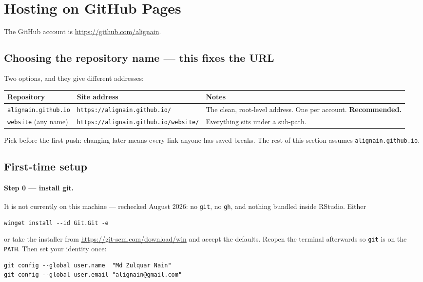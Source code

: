 \documentclass[11pt,a4paper]{article}
\begin{document}
\section{Hosting on GitHub Pages}

The GitHub account is \url{https://github.com/alignain}.

\subsection{Choosing the repository name --- this fixes the URL}

Two options, and they give different addresses:

\begin{center}
\begin{tabular}{@{}llp{5.4cm}@{}}
\toprule
\textbf{Repository} & \textbf{Site address} & \textbf{Notes} \\
\midrule
\texttt{alignain.github.io} & \texttt{https://alignain.github.io/} &
  The clean, root-level address. One per account. \textbf{Recommended.} \\
\texttt{website} (any name) & \texttt{https://alignain.github.io/website/} &
  Everything sits under a sub-path. \\
\bottomrule
\end{tabular}
\end{center}

Pick before the first push: changing later means every link anyone has
saved breaks. The rest of this section assumes \texttt{alignain.github.io}.

\subsection{First-time setup}

\paragraph{Step 0 --- install git.} It is not currently on this machine ---
rechecked August 2026: no \texttt{git}, no \texttt{gh}, and nothing bundled
inside RStudio. Either
\begin{lstlisting}
winget install --id Git.Git -e
\end{lstlisting}
or take the installer from \url{https://git-scm.com/download/win} and accept
the defaults. Reopen the terminal afterwards so \texttt{git} is on the
\texttt{PATH}. Then set your identity once:
\begin{lstlisting}
git config --global user.name  "Md Zulquar Nain"
git config --global user.email "alignain@gmail.com"
\end{lstlisting}
\end{document}
